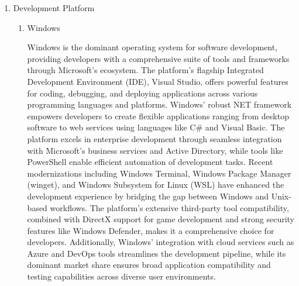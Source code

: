\documentclass[conference]{IEEEtran}
\begin{document}
\begin{enumerate}[label=\arabic*]
    \item Development Platform\par
    \vspace{0.3em}

    \begin{enumerate}[label=\arabic*)]
        \item Windows\par
        \vspace{0.3em}
        Windows is the dominant operating system for software development, providing developers with a comprehensive suite of tools and frameworks through Microsoft's ecosystem. The platform's flagship Integrated Development Environment (IDE), Visual Studio, offers powerful features for coding, debugging, and deploying applications across various programming languages and platforms. Windows' robust NET framework empowers developers to create flexible applications ranging from desktop software to web services using languages like C\# and Visual Basic. The platform excels in enterprise development through seamless integration with Microsoft's business services and Active Directory, while tools like PowerShell enable efficient automation of development tasks. Recent modernizations including Windows Terminal, Windows Package Manager (winget), and Windows Subsystem for Linux (WSL) have enhanced the development experience by bridging the gap between Windows and Unix-based workflows. The platform's extensive third-party tool compatibility, combined with DirectX support for game development and strong security features like Windows Defender, makes it a comprehensive choice for developers. Additionally, Windows' integration with cloud services such as Azure and DevOps tools streamlines the development pipeline, while its dominant market share ensures broad application compatibility and testing capabilities across diverse user environments.

        \vspace{1em}


\end{enumerate}
\end{enumerate}
\end{document}
